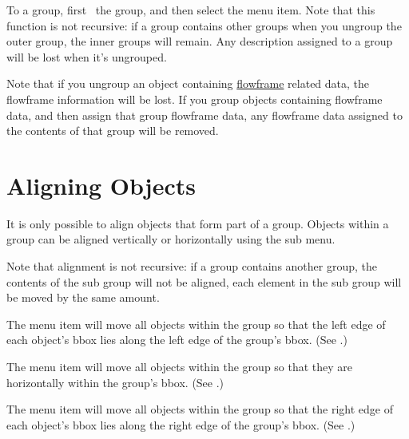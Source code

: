 To  a group, first \select\ the
group, and then select the  menu item. Note
that this function is not recursive: if a group contains other
groups when you ungroup the outer group, the inner groups will
remain.  Any description assigned to a group will be lost when it's
ungrouped.

\begin{warning}
Note that if you ungroup an \gls*{object} containing
\hyperref[sec:flowframe]{flowframe} related
data, the \gls{flowframe} information will be lost. If you group objects
containing flowframe data, and then assign that group flowframe data,
any flowframe data assigned to the contents of that group will be
removed.
\end{warning}



\section{Aligning Objects}\label{sec:alignobjects}


It is only possible to align \glspl{object} that form part of a
\gls{group}. Objects within a group can be aligned vertically or
horizontally using the  sub menu.

Note that alignment is not recursive: if a group contains another
group, the contents of the sub group will not be aligned, each
element in the sub group will be moved by the same amount.


The  menu item will move all objects
within the \gls{group} so that the left edge of each object's \gls{bbox}
lies along the left edge of the group's \gls*{bbox}.  (See
.)


The  menu item will move all objects
within the \gls{group} so that they are  horizontally
within the group's \gls*{bbox}.  (See .)


The  menu item will move all objects
within the \gls{group} so that the right edge of each object's \gls*{bbox}
lies along the right edge of the group's \gls*{bbox}.  (See
.)


